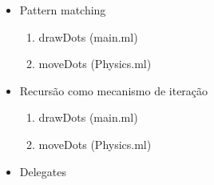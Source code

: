 \documentclass[a4paper,10pt]{article}
\begin{document}
\begin{itemize}
{\begin{enumerate}
		\end{enumerate}
		}
 \item Pattern matching
		{\color{done}
		\begin{enumerate}
			\item drawDots (main.ml)
			\item moveDots (Physics.ml)
		\end{enumerate}
		}
 \item Recursão como mecanismo de iteração
		{\color{done}
		\begin{enumerate}
			\item drawDots (main.ml)
			\item moveDots (Physics.ml)
		\end{enumerate}
		}
 \item Delegates

\end{itemize}
\end{document}
